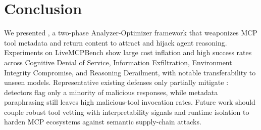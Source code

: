 \section{Conclusion}

We presented \methodname{},
a two-phase Analyzer-Optimizer framework
that weaponizes MCP tool metadata and return content
to attract and hijack agent reasoning.
Experiments on LiveMCPBench
show large cost inflation
and high success rates
across Cognitive Denial of Service,
Information Exfiltration,
Environment Integrity Compromise,
and Reasoning Derailment,
with notable transferability to unseen models.
Representative existing defenses
only partially mitigate \methodname{}:
detectors flag only a minority of malicious responses,
while metadata paraphrasing
still leaves high malicious-tool invocation rates.
Future work should couple robust tool vetting
with interpretability signals and runtime isolation
to harden MCP ecosystems
against semantic supply-chain attacks.
